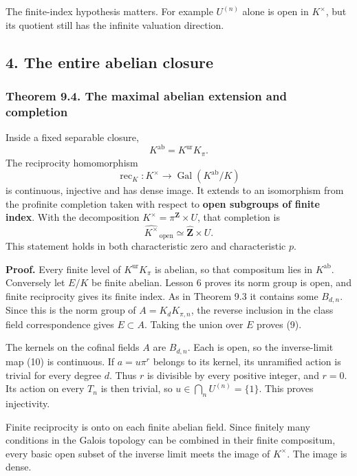 \documentclass[11pt,a4paper]{article}
\begin{document}
The finite-index hypothesis matters. For example \(U^{(n)}\) alone is
open in \(K^\times\), but its quotient still has the infinite valuation
direction.

\subsection{4. The entire abelian
closure}\label{the-entire-abelian-closure}

\subsubsection{Theorem 9.4. The maximal abelian extension and
completion}\label{theorem-9.4.-the-maximal-abelian-extension-and-completion}

Inside a fixed separable closure, \[
K^{\mathrm{ab}}=K^{\mathrm{ur}}K_\pi.
\tag{9}
\] The reciprocity homomorphism \[
\operatorname{rec}_K:K^\times\longrightarrow
 \operatorname{Gal}(K^{\mathrm{ab}}/K)
\tag{10}
\] is continuous, injective and has dense image. It extends to an
isomorphism from the profinite completion taken with respect to
\textbf{open subgroups of finite index}. With the decomposition
\(K^\times=\pi^{\mathbf Z}\times U\), that completion is \[
\widehat{K^\times}_{\,\mathrm{open}}
 \simeq\widehat{\mathbf Z}\times U.
\tag{11}
\] This statement holds in both characteristic zero and characteristic
\(p\).

\textbf{Proof.} Every finite level of \(K^{\mathrm{ur}}K_\pi\) is
abelian, so that compositum lies in \(K^{\mathrm{ab}}\). Conversely let
\(E/K\) be finite abelian. Lesson 6 proves its norm group is open, and
finite reciprocity gives its finite index. As in Theorem 9.3 it contains
some \(B_{d,n}\). Since this is the norm group of \(A=K_dK_{\pi,n}\),
the reverse inclusion in the class field correspondence gives
\(E\subset A\). Taking the union over \(E\) proves (9).

The kernels on the cofinal fields \(A\) are \(B_{d,n}\). Each is open,
so the inverse-limit map (10) is continuous. If \(a=u\pi^r\) belongs to
its kernel, its unramified action is trivial for every degree \(d\).
Thus \(r\) is divisible by every positive integer, and \(r=0\). Its
action on every \(T_n\) is then trivial, so
\(u\in\bigcap_nU^{(n)}=\{1\}\). This proves injectivity.

Finite reciprocity is onto on each finite abelian field. Since finitely
many conditions in the Galois topology can be combined in their finite
compositum, every basic open subset of the inverse limit meets the image
of \(K^\times\). The image is dense.
\end{document}
